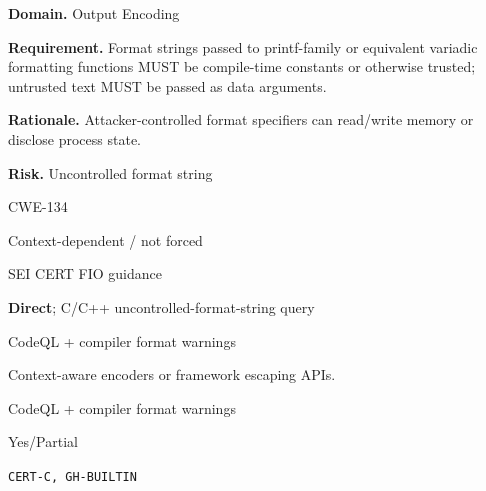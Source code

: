 \documentclass[10pt,letterpaper]{article}
\newcommand{\prioritybadge}[2]{\tcbox[on line,boxrule=0pt,arc=1.2mm,boxsep=0.7mm,left=1mm,right=1mm,top=0.4mm,bottom=0.4mm,colback=#2!12,coltext=#2]{\scriptsize\bfseries #1}}
\begin{document}
\begin{rulebox}[title={\texttt{SCS-C-OUTPUT-001} \hfill \prioritybadge{High Priority}{High}}]
\textbf{Domain.} Output Encoding

\textbf{Requirement.} Format strings passed to printf-family or equivalent variadic formatting functions MUST be compile-time constants or otherwise trusted; untrusted text MUST be passed as data arguments.

\textbf{Rationale.} Attacker-controlled format specifiers can read/write memory or disclose process state.

\textbf{Risk.} Uncontrolled format string

\begin{description}[leftmargin=2.65cm,labelwidth=2.3cm,style=nextline,itemsep=1pt,topsep=3pt]
  \item[CWE] CWE-134
  \item[OWASP] Context-dependent / not forced
  \item[CERT] SEI CERT FIO guidance
  \item[CodeQL] \textbf{Direct}; C/C++ uncontrolled-format-string query
  \item[Enforcement] CodeQL + compiler format warnings
  \item[Prevention] Context-aware encoders or framework escaping APIs.
  \item[Verification] CodeQL + compiler format warnings
  \item[Automation] Yes/Partial
  \item[Sources] \texttt{CERT-C, GH-BUILTIN}
\end{description}
\end{rulebox}
\end{document}
